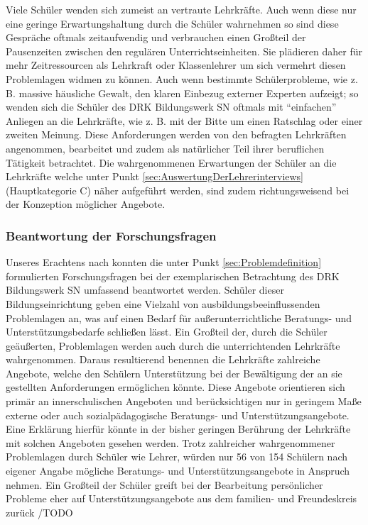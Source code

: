 Viele Schüler wenden sich zumeist an vertraute Lehrkräfte. Auch wenn diese nur eine geringe Erwartungshaltung durch die Schüler wahrnehmen so sind diese Gespräche oftmals zeitaufwendig und verbrauchen einen Großteil der Pausenzeiten zwischen den regulären Unterrichtseinheiten. Sie plädieren daher für mehr Zeitressourcen als Lehrkraft oder Klassenlehrer um sich vermehrt diesen Problemlagen widmen zu können. Auch wenn bestimmte Schülerprobleme, wie z. B. massive häusliche Gewalt, den klaren Einbezug externer Experten aufzeigt; so wenden sich die Schüler des DRK Bildungswerk SN oftmals mit "`einfachen"' Anliegen an die Lehrkräfte, wie z. B. mit der Bitte um einen Ratschlag oder einer zweiten Meinung. Diese Anforderungen werden von den befragten Lehrkräften angenommen, bearbeitet und zudem als natürlicher Teil ihrer beruflichen Tätigkeit betrachtet. Die wahrgenommenen Erwartungen der Schüler an die Lehrkräfte welche unter Punkt \ref{sec:AuswertungDerLehrerinterviews} (Hauptkategorie C) näher aufgeführt werden, sind zudem richtungsweisend bei der Konzeption möglicher Angebote.

\subsubsection{Beantwortung der Forschungsfragen}
\label{sec:BeantwortungDerForschungsfragen}

Unseres Erachtens nach konnten die unter Punkt \ref{sec:Problemdefinition} formulierten Forschungsfragen bei der exemplarischen Betrachtung des DRK Bildungswerk SN umfassend beantwortet werden. Schüler dieser Bildungseinrichtung geben eine Vielzahl von ausbildungsbeeinflussenden Problemlagen an, was auf einen Bedarf für außerunterrichtliche Beratungs- und Unterstützungsbedarfe schließen lässt. Ein Großteil der, durch die Schüler geäußerten, Problemlagen werden auch durch die unterrichtenden Lehrkräfte wahrgenommen. Daraus resultierend benennen die Lehrkräfte zahlreiche Angebote, welche den Schülern Unterstützung bei der Bewältigung der an sie gestellten Anforderungen ermöglichen könnte. Diese Angebote orientieren sich primär an innerschulischen Angeboten und berücksichtigen nur in geringem Maße externe oder auch sozialpädagogische Beratungs- und Unterstützungsangebote. Eine Erklärung hierfür könnte in der bisher geringen Berührung der Lehrkräfte mit solchen Angeboten gesehen werden. Trotz zahlreicher wahrgenommener Problemlagen durch Schüler wie Lehrer, würden nur 56 von 154 Schülern nach eigener Angabe mögliche Beratungs- und Unterstützungsangebote in Anspruch nehmen. Ein Großteil der Schüler greift bei der Bearbeitung persönlicher Probleme eher auf Unterstützungsangebote aus dem familien- und Freundeskreis zurück /TODO 

